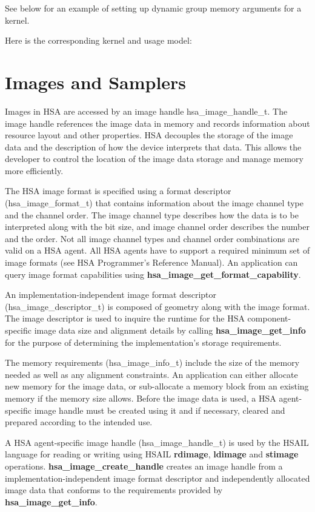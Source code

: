 \documentclass[draft]{book}
\newcommand{\reffun}[1]{\textbf{#1}}
\newcommand{\reftyp}[1]{#1}
\newcommand{\refhsl}[1]{\reffun{#1}}
\begin{document}
See below for an example of setting up dynamic group memory arguments for a
kernel.  

Here is the corresponding kernel and usage model:



\section{Images and Samplers}
\label{images} \hypertarget{images}{}

Images in HSA are accessed by an image handle \reftyp{hsa_image_handle_t}. The
image handle references the image data in memory and records information about
resource layout and other properties. HSA decouples the storage of the image
data and the description of how the device interprets that data. This allows the
developer to control the location of the image data storage and manage memory
more efficiently.

The HSA image format is specified using a format descriptor
(\reftyp{hsa_image_format_t}) that contains information about the image channel
type and the channel order. The image channel type describes how the data is to
be interpreted along with the bit size, and image channel order describes the
number and the order. Not all image channel types and channel order combinations
are valid on a HSA agent. All HSA agents have to support a required minimum set
of image formats (see HSA Programmer's Reference Manual). An application can
query image format capabilities using \reffun{hsa_image_get_format_capability}.

An implementation-independent image format descriptor
(\reftyp{hsa_image_descriptor_t}) is composed of geometry along with the
image format. The image descriptor is used to inquire the runtime for the HSA
component-specific image data size and alignment details by calling
\reffun{hsa_image_get_info} for the purpose of determining the
implementation's storage requirements.

The memory requirements (\reftyp{hsa_image_info_t}) include the size of the
memory needed as well as any alignment constraints. An application can either
allocate new memory for the image data, or sub-allocate a memory block from an
existing memory if the memory size allows. Before the image data is used, a HSA
agent-specific image handle must be created using it and if necessary, cleared
and prepared according to the intended use.

A HSA agent-specific image handle (\reftyp{hsa_image_handle_t}) is used by the
HSAIL language for reading or writing using HSAIL \refhsl{rdimage},
\refhsl{ldimage} and \refhsl{stimage}
operations. \reffun{hsa_image_create_handle} creates an image handle from a
implementation-independent image format descriptor and independently allocated
image data that conforms to the requirements provided by
\reffun{hsa_image_get_info}.
\end{document}

